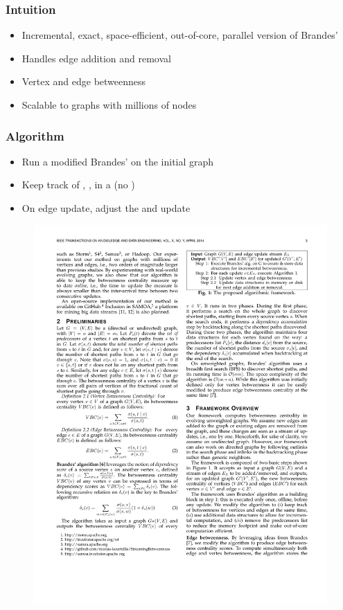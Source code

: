 \begin{frame}
  \frametitle{Intuition}

  \begin{itemize}
    \item Incremental, exact, space-efficient, out-of-core, parallel version of Brandes'
    \item Handles edge addition and removal
    \item Vertex and edge betweenness
    \item Scalable to graphs with millions of nodes
  \end{itemize}

\end{frame}


\begin{frame}
  \frametitle{Algorithm}

  \begin{itemize}
    \item Run a modified Brandes' on the initial graph
    \item Keep track of \dist, \paths, \dep in a \spdag (no \pred)
    \item On edge update, adjust the \spdag and update \betw
  \end{itemize}

  \begin{figure}[t]
    \centering
    \includegraphics[width=\textwidth, height=0.6\textheight, keepaspectratio]{imgs/kdb-algo}
  \end{figure}

\end{frame}


